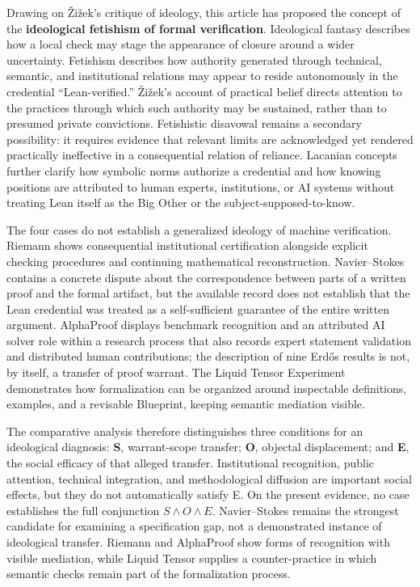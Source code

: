 \documentclass[sn-apa]{sn-jnl}
\begin{document}
Drawing on Žižek’s critique of ideology, this article has proposed the concept of the \textbf{ideological fetishism of formal verification}. Ideological fantasy describes how a local check may stage the appearance of closure around a wider uncertainty. Fetishism describes how authority generated through technical, semantic, and institutional relations may appear to reside autonomously in the credential “Lean-verified.” Žižek’s account of practical belief directs attention to the practices through which such authority may be sustained, rather than to presumed private convictions. Fetishistic disavowal remains a secondary possibility: it requires evidence that relevant limits are acknowledged yet rendered practically ineffective in a consequential relation of reliance. Lacanian concepts further clarify how symbolic norms authorize a credential and how knowing positions are attributed to human experts, institutions, or AI systems without treating Lean itself as the Big Other or the subject-supposed-to-know.

The four cases do not establish a generalized ideology of machine verification. Riemann shows consequential institutional certification alongside explicit checking procedures and continuing mathematical reconstruction. Navier–Stokes contains a concrete dispute about the correspondence between parts of a written proof and the formal artifact, but the available record does not establish that the Lean credential was treated as a self-sufficient guarantee of the entire written argument. AlphaProof displays benchmark recognition and an attributed AI solver role within a research process that also records expert statement validation and distributed human contributions; the description of nine Erdős results is not, by itself, a transfer of proof warrant. The Liquid Tensor Experiment demonstrates how formalization can be organized around inspectable definitions, examples, and a revisable Blueprint, keeping semantic mediation visible.

The comparative analysis therefore distinguishes three conditions for an ideological diagnosis: \textbf{S}, warrant-scope transfer; \textbf{O}, objectal displacement; and \textbf{E}, the social efficacy of that alleged transfer. Institutional recognition, public attention, technical integration, and methodological diffusion are important social effects, but they do not automatically satisfy E. On the present evidence, no case establishes the full conjunction \(S\land O\land E\). Navier–Stokes remains the strongest candidate for examining a specification gap, not a demonstrated instance of ideological transfer. Riemann and AlphaProof show forms of recognition with visible mediation, while Liquid Tensor supplies a counter-practice in which semantic checks remain part of the formalization process.
\end{document}
